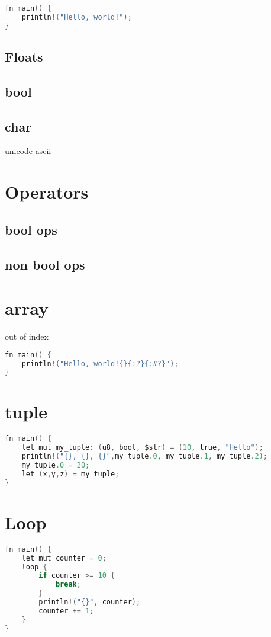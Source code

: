 \documentclass{book}
\begin{document}
\begin{lstlisting}[language=C, caption=Definition variables]
fn main() {
    println!("Hello, world!");
}
\end{lstlisting}
\subsection{Floats}
\subsection{bool}
\subsection{char}
unicode
ascii
\section{Operators}
\subsection{bool ops}
\subsection{non bool ops}
\section{array}
out of index
\begin{lstlisting}[language=C, caption=Definition array]
fn main() {
    println!("Hello, world!{}{:?}{:#?}");
}
\end{lstlisting}
\section{tuple}
\begin{lstlisting}[language=C, caption=Definition Tuple]
fn main() {
    let mut my_tuple: (u8, bool, $str) = (10, true, "Hello");
    println!("{}, {}, {}",my_tuple.0, my_tuple.1, my_tuple.2);
    my_tuple.0 = 20;
    let (x,y,z) = my_tuple;
}
\end{lstlisting}
\section{Loop}
\begin{lstlisting}[language=C, caption=Definition Loop]
fn main() {
    let mut counter = 0;
    loop {
        if counter >= 10 {
            break;
        }
        println!("{}", counter);
        counter += 1;
    }
}
\end{lstlisting}
\lstlistoflistings
\end{document}
